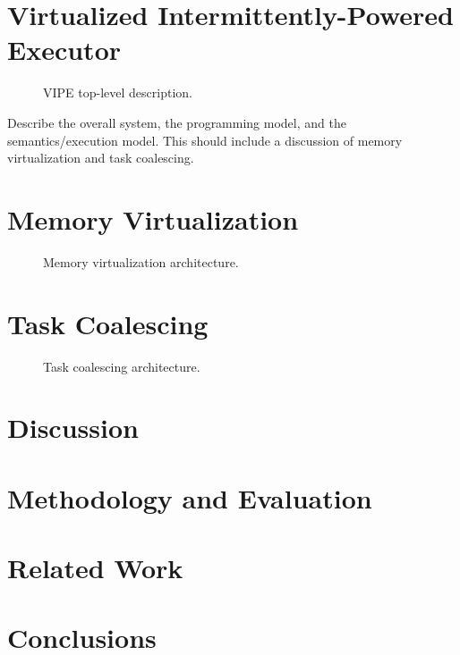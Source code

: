 \documentclass[pageno]{jpaper}
\newcommand{\sys}{VIPE\xspace}
\newcommand{\sysfull}{Virtualized Intermittently-Powered Executor\xspace}
\begin{document}
\section{\sysfull}
\label{sec:overeall_system}

\begin{figure}
	\centering
	\caption{\sys top-level description.}
	\label{fig:}
\end{figure}

Describe the overall system, the programming model, and the semantics/execution model. This should include a discussion of memory virtualization and task coalescing.

\section{Memory Virtualization}
\label{sec:memory_virtulaization}

\begin{figure}
	\centering
	\caption{Memory virtualization architecture.}
	\label{fig:}
\end{figure}

\section{Task Coalescing}
\label{sec:memory_virtulaization}

\begin{figure}
	\centering
	\caption{Task coalescing architecture.}
	\label{fig:}
\end{figure}

\section{Discussion}
\label{sec:discussion}

\section{Methodology and Evaluation}
\label{sec:methodology_evaluation}

\section{Related Work}
\label{sec:related_work}

\section{Conclusions}
\label{sec:conclusions}
\end{document}
